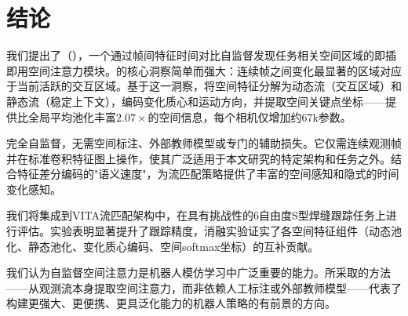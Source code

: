 \section{结论}
\label{sec:conclusion}

我们提出了\fasa{}（\fasafull{}），一个通过帧间特征时间对比自监督发现任务相关空间区域的即插即用空间注意力模块。\fasa{}的核心洞察简单而强大：连续帧之间变化最显著的区域对应于当前活跃的交互区域。基于这一洞察，\fasa{}将空间特征分解为动态流（交互区域）和静态流（稳定上下文），编码变化质心和运动方向，并提取空间关键点坐标——提供比全局平均池化丰富$2.07\times$的空间信息，每个相机仅增加约67k参数。

\fasa{}完全自监督，无需空间标注、外部教师模型或专门的辅助损失。它仅需连续观测帧并在标准卷积特征图上操作，使其广泛适用于本文研究的特定架构和任务之外。结合特征差分编码的"语义速度"，\fasa{}为流匹配策略提供了丰富的空间感知和隐式的时间变化感知。

我们将\fasa{}集成到VITA流匹配架构中，在具有挑战性的6自由度S型焊缝跟踪任务上进行评估。实验表明\fasa{}显著提升了跟踪精度，消融实验证实了各空间特征组件（动态池化、静态池化、变化质心编码、空间softmax坐标）的互补贡献。

我们认为自监督空间注意力是机器人模仿学习中广泛重要的能力。\fasa{}所采取的方法——从观测流本身提取空间注意力，而非依赖人工标注或外部教师模型——代表了构建更强大、更便携、更具泛化能力的机器人策略的有前景的方向。
